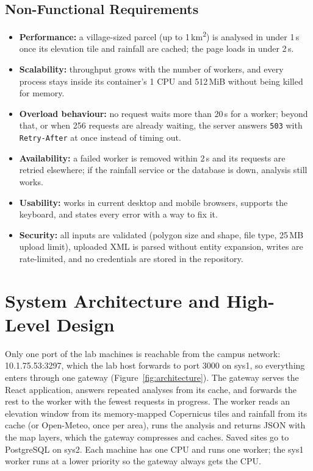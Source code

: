 \documentclass[manuscript,screen,review]{acmart}
\begin{document}
\subsection{Non-Functional Requirements}
\begin{itemize}
  \item \textbf{Performance:} a village-sized parcel (up to 1\,km\textsuperscript{2}) is analysed
    in under 1\,s once its elevation tile and rainfall are cached; the page loads in under 2\,s.
  \item \textbf{Scalability:} throughput grows with the number of workers, and every process stays
    inside its container's 1 CPU and 512\,MiB without being killed for memory.
  \item \textbf{Overload behaviour:} no request waits more than 20\,s for a worker; beyond that,
    or when 256 requests are already waiting, the server answers \texttt{503} with
    \texttt{Retry-After} at once instead of timing out.
  \item \textbf{Availability:} a failed worker is removed within 2\,s and its requests are retried
    elsewhere; if the rainfall service or the database is down, analysis still works.
  \item \textbf{Usability:} works in current desktop and mobile browsers, supports the keyboard,
    and states every error with a way to fix it.
  \item \textbf{Security:} all inputs are validated (polygon size and shape, file type, 25\,MB
    upload limit), uploaded XML is parsed without entity expansion, writes are rate-limited, and
    no credentials are stored in the repository.
\end{itemize}

\section{System Architecture and High-Level Design}
\label{sec:architecture}
Only one port of the lab machines is reachable from the campus network: 10.1.75.53:3297, which the
lab host forwards to port 3000 on sys1, so everything enters through one gateway
(Figure~\ref{fig:architecture}). The gateway serves the React application, answers repeated
analyses from its cache, and forwards the rest to the worker with the fewest requests in progress.
The worker reads an elevation window from its memory-mapped Copernicus tiles and rainfall from its
cache (or Open-Meteo, once per area), runs the analysis and returns JSON with the map layers, which
the gateway compresses and caches. Saved sites go to PostgreSQL on sys2. Each machine has one CPU
and runs one worker; the sys1 worker runs at a lower priority so the gateway always gets the CPU.
\end{document}

